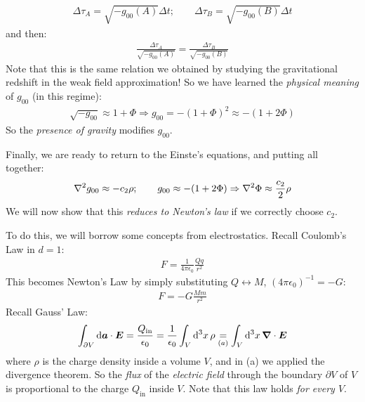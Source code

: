 \documentclass[../template.tex]{subfiles}
\begin{document}
\begin{align*}
    \Delta \tau_A = \sqrt{-g_{00} (A)} \Delta t; \qquad \Delta \tau_B = \sqrt{-g_{00} (B)} \Delta t 
\end{align*}    
and then:
\begin{align*}
    \frac{\Delta \tau_A}{\sqrt{-g_{00} (A)}} = \frac{\Delta \tau_B}{\sqrt{-g_{00} (B)}}  
\end{align*}
Note that this is the same relation we obtained by studying the gravitational redshift in the weak field approximation! So we have learned the \textit{physical meaning} of $g_{00}$ (in this regime):
\begin{align*}
    \sqrt{-g_{00}} \approx 1 + \Phi \Rightarrow g_{00} = - (1 + \Phi)^2 \approx -(1+ 2 \Phi)
\end{align*}  
So the \textit{presence of gravity} modifies $g_{00}$. 

Finally, we are ready to return to the Einste's equations, and putting all together:
\begin{align*}
    \laplacian g_{00} \approx -c_2 \rho; \qquad g_{00} \approx -(1+ 2 \Phi) \Rightarrow \laplacian \Phi \approx \frac{c_2}{2} \rho 
\end{align*}
We will now show that this \textit{reduces to Newton's law} if we correctly choose $c_2$. 

To do this, we will borrow some concepts from electrostatics. Recall Coulomb's Law in $d=1$:
\begin{align*}
    F = \frac{1}{4 \pi \epsilon_0} \frac{Q q}{r^2}  
\end{align*} 
This becomes Newton's Law by simply substituting $Q \leftrightarrow M$, $(4 \pi \epsilon_0)^{-1} = - G$:
\begin{align*}
    F = - G \frac{M m}{r^2} 
\end{align*}
Recall Gauss' Law:
\begin{align*}
    \int_{\partial V} \dd{\bm{a}} \cdot \bm{E} = \frac{Q_{\mathrm{in} }}{\epsilon_0}  =\frac{1}{\epsilon_0}   \int_V \dd[3]{x} \rho \underset{(a)}{=}  \int_V \dd[3]{x} \vnabla \cdot \bm{E}
\end{align*}
where $\rho$ is the charge density inside a volume $V$, and in (a) we applied the divergence theorem. So the \textit{flux} of the \textit{electric field} through the boundary $\partial V$ of $V$ is proportional to the charge $Q_{\mathrm{in} }$ inside $V$. Note that this law holds \textit{for every $V$}. 
\end{document}
